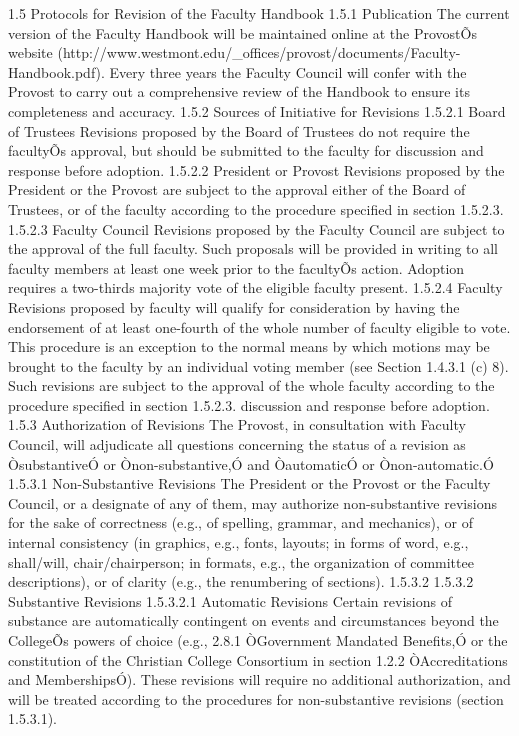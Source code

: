 \documentclass[letterpaper, 11pt]{article}
\begin{document}
1.5 Protocols for Revision of the Faculty Handbook
1.5.1 Publication
   The current version of the Faculty Handbook will be maintained online at the ProvostÕs website (http://www.westmont.edu/_offices/provost/documents/Faculty-Handbook.pdf).  Every three years the Faculty Council will confer with the Provost to carry out a comprehensive review of the Handbook to ensure its completeness and accuracy.
1.5.2 Sources of Initiative for Revisions
1.5.2.1 Board of Trustees
Revisions proposed by the Board of Trustees do not require the facultyÕs approval, but should be submitted to the faculty for discussion and response before adoption.
1.5.2.2 President or Provost
Revisions proposed by the President or the Provost are subject to the approval either of the Board of Trustees, or of the faculty according to the procedure specified in section 1.5.2.3.
1.5.2.3 Faculty Council
Revisions proposed by the Faculty Council are subject to the approval of the full faculty. Such proposals will be provided in writing to all faculty members at least one week prior to the facultyÕs action. Adoption requires a two-thirds majority vote of the eligible faculty present.
1.5.2.4 Faculty
Revisions proposed by faculty will qualify for consideration by having the endorsement of at least one-fourth of the whole number of faculty eligible to vote. This procedure is an exception to the normal means by which motions may be brought to the faculty by an individual voting member (see Section 1.4.3.1 (c) 8).  Such revisions are subject to the approval of the whole faculty according to the procedure specified in section 1.5.2.3.
   discussion and response before adoption.
1.5.3 Authorization of Revisions
       The Provost, in consultation with Faculty Council, will adjudicate all questions concerning the status of a revision as ÒsubstantiveÓ or Ònon-substantive,Ó and ÒautomaticÓ or Ònon-automatic.Ó
1.5.3.1 Non-Substantive Revisions
The President or the Provost or the Faculty Council, or a designate of any of them, may authorize non-substantive revisions for the sake of correctness (e.g., of spelling, grammar, and mechanics), or of internal consistency (in graphics, e.g., fonts, layouts; in forms of word, e.g., shall/will, chair/chairperson; in formats, e.g., the organization of committee descriptions), or of clarity (e.g., the renumbering of sections).
1.5.3.2 1.5.3.2 Substantive Revisions
1.5.3.2.1 Automatic Revisions
Certain revisions of substance are automatically contingent on events and circumstances beyond the CollegeÕs powers of choice (e.g., 2.8.1 ÒGovernment Mandated Benefits,Ó or the constitution of the Christian College Consortium in section 1.2.2 ÒAccreditations and MembershipsÓ). These revisions will require no additional authorization, and will be treated according to the procedures for non-substantive revisions (section 1.5.3.1).
\end{document}
